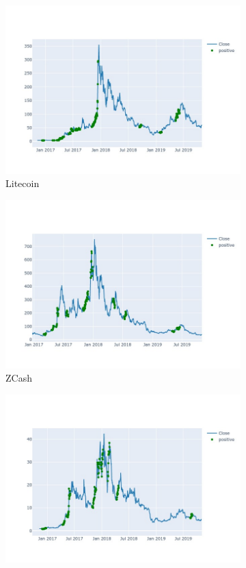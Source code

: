 \documentclass[letterpaper]{article}
\begin{document}
\begin{figure}[H]
\begin{subfigure}[b]{0.45\linewidth}
        \includegraphics[width=\linewidth]{images/LTC.jpg}
        \caption{Litecoin}  
        \label{fig:litecoin}
    \end{subfigure}
    \begin{subfigure}[b]{0.45\linewidth}
        \includegraphics[width=\linewidth]{images/ZEC.jpg}
        \caption{ZCash}  
        \label{fig:zcash}
    \end{subfigure}
    \begin{subfigure}[b]{0.45\linewidth}
        \includegraphics[width=\linewidth]{images/ETC.jpg}

\end{subfigure}
\end{figure}
\end{document}
